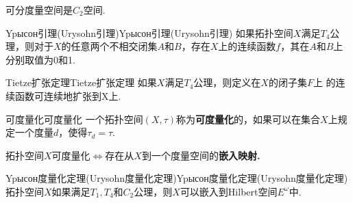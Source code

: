\documentclass{ctexart}
\begin{document}
\begin{命题}{}{}
	可分度量空间是$C_2$空间.
\end{命题}
\begin{定理}{Ypысон引理(Urysohn引理)}{Ypысон引理(Urysohn引理)}
	如果拓扑空间$X$满足$T_4$公理，则对于$X$的任意两个不相交闭集$A$和$B$，存在$X$上的连续函数$f$，其在$A$和$B$上分别取值为0和1.
\end{定理}
\begin{定理}{Tietze扩张定理}{Tietze扩张定理}
	如果$X$满足$T_4$公理，则定义在$X$的闭子集$F$上 的连续函数可连续地扩张到X上.
\end{定理}
\begin{定理}{可度量化}{可度量化}
	一个拓扑空间$(X,\tau)$称为\textbf{可度量化}的，如果可以在集合$X$上规定一个度量$d$，使得$\tau_d =\tau.$
\end{定理}
\begin{命题}{}{}
	拓扑空间$X$可度量化$\Leftrightarrow$存在从$X$到一个度量空间的\textbf{嵌入映射.}
\end{命题}
\begin{定理}{Ypысон度量化定理(Urysohn度量化定理)}{Ypысон度量化定理(Urysohn度量化定理)}
	拓扑空间$X$如果满足$T_1,T_4$和$C_2$公理，则$X$可以嵌入到Hilbert空间$E^{\omega}$中.
\end{定理}
\end{document}
